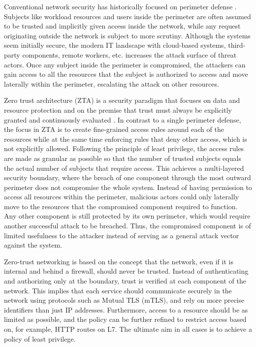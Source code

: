 \documentclass[english, 12pt, a4paper, sci, utf8, a-2b, online]{aaltothesis}
\begin{document}
Conventional network security has historically focused on perimeter defense \cite{kerman2020implementing}.
Subjects like workload resources and users inside the perimeter are often assumed to be trusted and implicitly given access inside the network, while any request originating outside the network is subject to more scrutiny.
Although the systems seem initially secure, the modern IT landscape with cloud-based systems, third-party components, remote workers, etc. increases the attack surface of threat actors.
Once any subject inside the perimeter is compromised, the attackers can gain access to all the resources that the subject is authorized to access and move laterally within the perimeter, escalating the attack on other resources.

Zero trust architecture (ZTA) is a security paradigm that focuses on data and resource protection and on the premise that trust must always be explicitly granted and continuously evaluated \cite{kerman2020implementing, rose2020zero}.
In contrast to a single perimeter defense, the focus in ZTA is to create fine-grained access rules around each of the resources while at the same time enforcing rules that deny other access, which is not explicitly allowed.
Following the principle of least privilege, the access rules are made as granular as possible so that the number of trusted subjects equals the actual number of subjects that require access.
This achieves a multi-layered security boundary, where the breach of one component through the most outward perimeter does not compromise the whole system.
Instead of having permission to access all resources within the perimeter, malicious actors could only laterally move to the resources that the compromised component required to function.
Any other component is still protected by its own perimeter, which would require another successful attack to be breached.
Thus, the compromised component is of limited usefulness to the attacker instead of serving as a general attack vector against the system.

Zero-trust networking is based on the concept that the network, even if it is internal and behind a firewall, should never be trusted.
Instead of authenticating and authorizing only at the boundary, trust is verified at each component of the network.
This implies that each service should communicate securely in the network using protocols such as Mutual TLS (mTLS), and rely on more precise identifiers than just IP addresses.
Furthermore, access to a resource should be as limited as possible, and the policy can be further refined to restrict access based on, for example, HTTP routes on L7.
The ultimate aim in all cases is to achieve a policy of least privilege.
\end{document}
